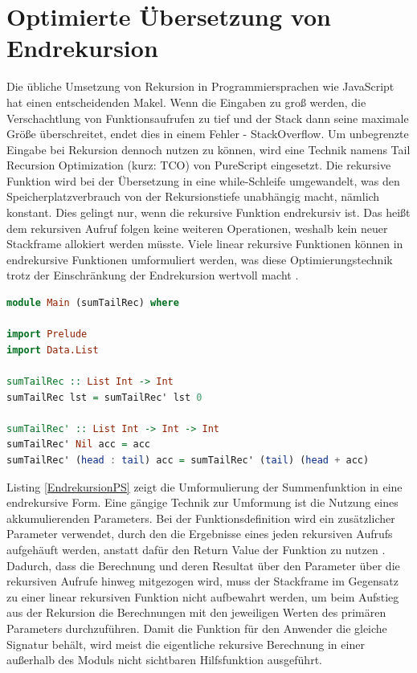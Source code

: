 \documentclass[
12pt,
ngerman,
oneside]
{scrbook} %
\begin{document}
\section{Optimierte Übersetzung von Endrekursion}
Die übliche Umsetzung von Rekursion in Programmiersprachen wie JavaScript hat einen entscheidenden Makel. Wenn die Eingaben zu groß werden, die Verschachtlung von Funktionsaufrufen zu tief und der Stack dann seine maximale Größe überschreitet, endet dies in einem Fehler - StackOverflow. Um unbegrenzte Eingabe bei Rekursion dennoch nutzen zu können, wird eine Technik namens \glqq Tail Recursion Optimization\grqq{} (kurz: TCO) von PureScript eingesetzt. Die rekursive Funktion wird bei der Übersetzung in eine while-Schleife umgewandelt, was den Speicherplatzverbrauch von der Rekursionstiefe unabhängig macht, nämlich konstant. Dies gelingt nur, wenn die rekursive Funktion endrekursiv ist. Das heißt dem rekursiven Aufruf folgen keine weiteren Operationen, weshalb kein neuer Stackframe allokiert werden müsste. Viele linear rekursive Funktionen können in endrekursive Funktionen umformuliert werden, was diese Optimierungstechnik trotz der Einschränkung der Endrekursion wertvoll macht \cite[][S. 42--43]{Freeman17}.

\begin{lstlisting}[language=purescript, style=numbered-and-boxed, caption=Endrekursion in PureScript, label=EndrekursionPS]
module Main (sumTailRec) where

import Prelude
import Data.List

sumTailRec :: List Int -> Int
sumTailRec lst = sumTailRec' lst 0

sumTailRec' :: List Int -> Int -> Int 
sumTailRec' Nil acc = acc
sumTailRec' (head : tail) acc = sumTailRec' (tail) (head + acc)
\end{lstlisting}

Listing \ref{EndrekursionPS} zeigt die Umformulierung der Summenfunktion in eine endrekursive Form. Eine gängige Technik zur Umformung ist die Nutzung eines akkumulierenden Parameters. Bei der Funktionsdefinition wird ein zusätzlicher  Parameter verwendet, durch den die Ergebnisse eines jeden rekursiven Aufrufs aufgehäuft werden, anstatt dafür den Return Value der Funktion zu nutzen \cite[][S. 43]{Freeman17}. Dadurch, dass die Berechnung und deren Resultat über den Parameter über die rekursiven Aufrufe hinweg mitgezogen wird, muss der Stackframe im Gegensatz zu einer linear rekursiven Funktion nicht aufbewahrt werden, um beim Aufstieg aus der Rekursion die Berechnungen mit den jeweiligen Werten des primären Parameters durchzuführen. Damit die Funktion für den Anwender die gleiche Signatur behält, wird meist die eigentliche rekursive Berechnung in einer  außerhalb des Moduls nicht sichtbaren Hilfsfunktion ausgeführt.
\end{document}
